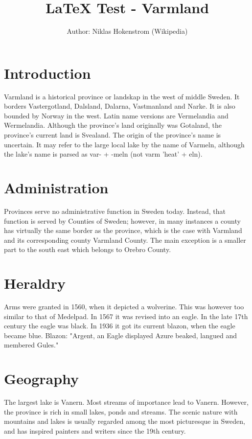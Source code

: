 \documentclass[a4paper, 11pt]{article}
\begin{document}
\title{\LaTeX{} Test - Varmland}
\author{Author: Niklas Hokenstrom (Wikipedia)}

\maketitle

\section{Introduction}
Varmland is a historical province or landskap in the west of middle Sweden. It borders Vastergotland, Dalsland, Dalarna, Vastmanland and Narke. It is also bounded by Norway in the west. Latin name versions are Vermelandia and Wermelandia. Although the province's land originally was Gotaland, the province's current land is Svealand. The origin of the province's name is uncertain. It may refer to the large local lake by the name of Varmeln, although the lake's name is parsed as var- + -meln (not varm 'heat' + eln).

\section{Administration}
Provinces serve no administrative function in Sweden today. Instead, that function is served by Counties of Sweden; however, in many instances a county has virtually the same border as the province, which is the case with Varmland and its corresponding county Varmland County. The main exception is a smaller part to the south east which belongs to Orebro County.

\section{Heraldry}
Arms were granted in 1560, when it depicted a wolverine. This was however too similar to that of Medelpad. In 1567 it was revised into an eagle. In the late 17th century the eagle was black. In 1936 it got its current blazon, when the eagle became blue. Blazon: "Argent, an Eagle displayed Azure beaked, langued and membered Gules."

\section{Geography}
The largest lake is Vanern. Most streams of importance lead to Vanern. However, the province is rich in small lakes, ponds and streams. The scenic nature with mountains and lakes is usually regarded among the most picturesque in Sweden, and has inspired painters and writers since the 19th century.
\end{document}
